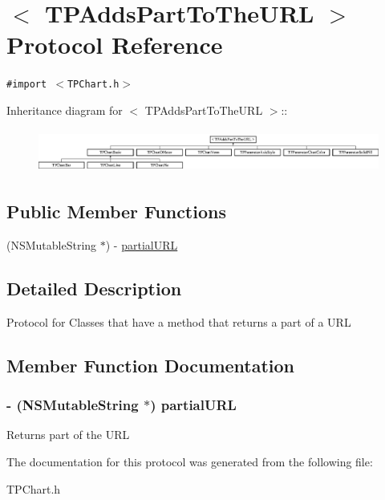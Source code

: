 \hypertarget{protocol_t_p_adds_part_to_the_u_r_l-p}{
\section{$<$ TPAddsPartToTheURL $>$ Protocol Reference}
\label{protocol_t_p_adds_part_to_the_u_r_l-p}
}
{\tt \#import $<$TPChart.h$>$}

Inheritance diagram for $<$ TPAddsPartToTheURL $>$::\begin{figure}[H]
\begin{center}
\leavevmode
\includegraphics[height=1.42012cm]{protocol_t_p_adds_part_to_the_u_r_l-p}
\end{center}
\end{figure}
\subsection*{Public Member Functions}
\begin{CompactItemize}
\item 
(NSMutableString $\ast$) - \hyperlink{protocol_t_p_adds_part_to_the_u_r_l-p_72b3763c3a89e5d7c40b2abc10db2c15}{partialURL}
\end{CompactItemize}


\subsection{Detailed Description}
Protocol for Classes that have a method that returns a part of a URL 

\subsection{Member Function Documentation}
\hypertarget{protocol_t_p_adds_part_to_the_u_r_l-p_72b3763c3a89e5d7c40b2abc10db2c15}{
\subsubsection[{partialURL}]{\setlength{\rightskip}{0pt plus 5cm}- (NSMutableString $\ast$) partialURL }}
\label{protocol_t_p_adds_part_to_the_u_r_l-p_72b3763c3a89e5d7c40b2abc10db2c15}


Returns part of the URL 

The documentation for this protocol was generated from the following file:\begin{CompactItemize}
\item 
TPChart.h\end{CompactItemize}
